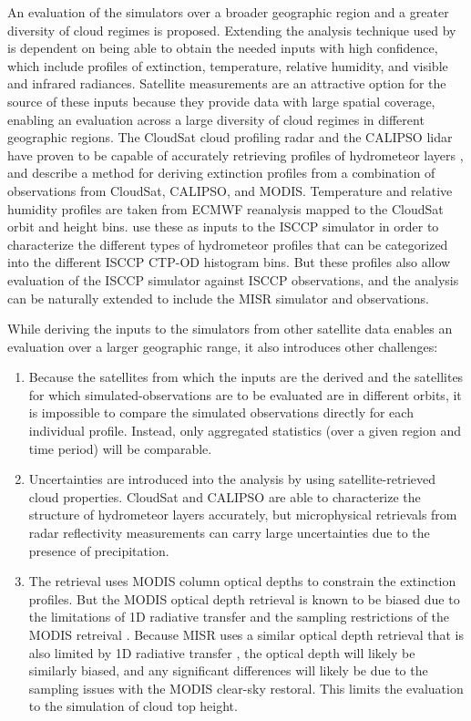 \documentclass[letter]{article}
\begin{document}
An evaluation of the simulators over a broader geographic region and a greater diversity of cloud regimes is proposed. Extending the analysis technique used by \cite{mace_et_al_2010} is dependent on being able to obtain the needed inputs with high confidence, which include profiles of extinction, temperature, relative humidity, and visible and infrared radiances. Satellite measurements are an attractive option for the source of these inputs because they provide data with large spatial coverage, enabling an evaluation across a large diversity of cloud regimes in different geographic regions. The CloudSat cloud profiling radar \citep{stephens_et_al_2002} and the CALIPSO lidar \citep{winker_et_al_2007} have proven to be capable of accurately retrieving profiles of hydrometeor layers \cite{mace_et_al_2009}, and \cite{mace_and_wrenn_2013} describe a method for deriving extinction profiles from a combination of observations from CloudSat, CALIPSO, and MODIS. Temperature and relative humidity profiles are taken from ECMWF reanalysis mapped to the CloudSat orbit and height bins. \cite{mace_and_wrenn_2013} use these as inputs to the ISCCP simulator in order to characterize the different types of hydrometeor profiles that can be categorized into the different ISCCP CTP-OD histogram bins. But these profiles also allow evaluation of the ISCCP simulator against ISCCP observations, and the analysis can be naturally extended to include the MISR simulator and observations.

While deriving the inputs to the simulators from other satellite data enables an evaluation over a larger geographic range, it also introduces other challenges: 
\begin{enumerate}
\item Because the satellites from which the inputs are the derived and the satellites for which simulated-observations are to be evaluated are in different orbits, it is impossible to compare the simulated observations directly for each individual profile. Instead, only aggregated statistics (over a given region and time period) will be comparable. 

\item Uncertainties are introduced into the analysis by using satellite-retrieved cloud properties. CloudSat and CALIPSO are able to characterize the structure of hydrometeor layers accurately, but microphysical retrievals from radar reflectivity measurements can carry large uncertainties due to the presence of precipitation. 

\item The \cite{mace_and_wrenn_2013} retrieval uses MODIS column optical depths to constrain the extinction profiles. But the MODIS optical depth retrieval is known to be biased due to the limitations of 1D radiative transfer and the sampling restrictions of the MODIS retreival \citep{pincus_et_al_2012}. Because MISR uses a similar optical depth retrieval that is also limited by 1D radiative transfer \citep{marchand_et_al_2010}, the optical depth will likely be similarly biased, and any significant differences will likely be due to the sampling issues with the MODIS clear-sky restoral. This limits the evaluation to the simulation of cloud top height.
\end{enumerate}
\end{document}
